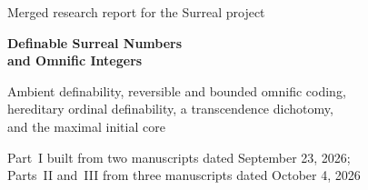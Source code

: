 \documentclass[11pt,a4paper]{article}
\numberwithin{equation}{section}
\theoremstyle{definition}
\theoremstyle{remark}
\newcommand{\HOD}{\mathrm{HOD}}
\begin{document}
\hypersetup{pageanchor=false}
\begin{titlepage}
\centering
\vspace*{0mm}
{\Large Merged research report for the Surreal project\par}
\vspace{7mm}
{\huge\bfseries Definable Surreal Numbers\\[3mm] and Omnific Integers\par}
\vspace{5mm}
{\Large Ambient definability, reversible and bounded omnific coding,\\[1mm]
hereditary ordinal definability, a transcendence dichotomy,\\[1mm]
and the maximal initial core\par}
\vspace{5mm}
{\large Part~I built from two manuscripts dated September 23, 2026;\\[1mm]
Parts~II and~III from three manuscripts dated October 4, 2026\par}
\vspace{4mm}
\begin{minipage}{\textwidth}
\begin{abstract}
A surreal number cannot be called definable without specifying a language,
a universe, and permitted parameters. We develop ambient set-theoretic
notions, keep them apart from definability in the ordered field and its
exponential expansion, and give an algebraic theory of the resulting
numbers. For a fixed parameter set, the ambiently definable surreals form a
real closed field closed under the Conway monomial map, the exponential and
the omnific floor; their omnific integers form an integer part whose
fraction field is exactly that field, with a denominator chosen from the
same parameters. Over a transitive model the definable field is an
elementary exponential subfield. Ordinal-definable surreals are exactly
the surreals of $\HOD$.


\end{abstract}
\end{minipage}
\end{titlepage}
\end{document}
